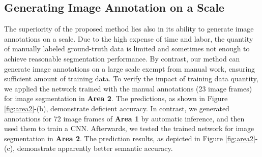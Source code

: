 \subsection{Generating Image Annotation on a Scale}
The superiority of the proposed method lies also in its ability to generate image annotations on a scale. Due to the high expense of time and labor, the quantity of manually labeled ground-truth data is limited and sometimes not enough to achieve reasonable segmentation performance. By contrast, our method can generate image annotations on a large scale exempt from manual work, ensuring sufficient amount of training data. To verify the impact of training data quantity, we applied the network trained with the manual annotations (23 image frames) for image segmentation in \textbf{Area 2}. The predictions, as shown in Figure \ref{fig:area2}-(b), demonstrate deficient accuracy. In contrast, we generated annotations for 72 image frames of \textbf{Area 1} by automatic inference, and then used them to train a CNN. Afterwards, we tested the trained network for image segmentation in \textbf{Area 2}. The prediction results, as depicted in Figure \ref{fig:area2}-(c), demonstrate apparently better semantic accuracy. 

